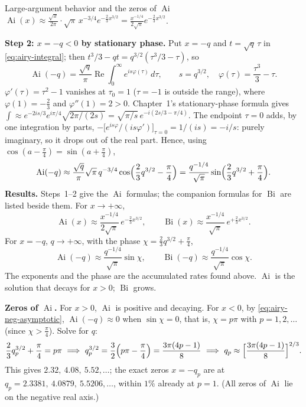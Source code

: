 \documentclass[11pt]{beamer}
\providecommand{\Ai}{\operatorname{Ai}}
\providecommand{\Bi}{\operatorname{Bi}}
\begin{document}
\begin{frame}[allowframebreaks=1.00]{Large-argument behavior and the zeros of $\Ai$}
\(\Ai(x)\approx\frac{\sqrt x}{2\pi}\cdot\sqrt\pi\,x^{-3/4}e^{-\frac23x^{3/2}}=\frac{x^{-1/4}}{2\sqrt\pi}e^{-\frac23x^{3/2}}\).
\par\framebreak\par
\textbf{Step 2: \(x=-q<0\) by stationary phase.} Put \(x=-q\) and \(t=\sqrt q\,\tau\) in \eqref{eq:airy-integral}; then
\(t^3/3-qt=q^{3/2}(\tau^3/3-\tau)\), so
\[
 \Ai(-q)=\frac{\sqrt q}{\pi}\operatorname{Re}\int_0^\infty e^{is\varphi(\tau)}\,d\tau,\qquad s=q^{3/2},\quad \varphi(\tau)=\frac{\tau^3}3-\tau .
\]
\(\varphi'(\tau)=\tau^2-1\) vanishes at \(\tau_0=1\) (\(\tau=-1\) is outside the range), where \(\varphi(1)=-\frac23\) and \(\varphi''(1)=2>0\).
Chapter~1's stationary-phase formula gives \(\int\approx e^{-2is/3}e^{i\pi/4}\sqrt{2\pi/(2s)}=\sqrt{\pi/s}\,e^{-i(2s/3-\pi/4)}\). The endpoint
\(\tau=0\) adds, by one integration by parts, \(-\bigl[e^{is\varphi}/(is\varphi')\bigr]_{\tau=0}=1/(is)=-i/s\): purely imaginary, so it drops
out of the real part. Hence, using \(\cos(a-\frac\pi4)=\sin(a+\frac\pi4)\),
\[
 \Ai(-q)\approx\frac{\sqrt q}{\pi}\sqrt\pi\,q^{-3/4}\cos\Bigl(\frac23q^{3/2}-\frac\pi4\Bigr)
 =\frac{q^{-1/4}}{\sqrt\pi}\sin\Bigl(\frac23q^{3/2}+\frac\pi4\Bigr).
\]
\textbf{Results.} Steps~1--2 give the \(\Ai\) formulas; the companion formulas for \(\Bi\) are listed
beside them. For \(x\to+\infty\),
\begin{equation}
 \Ai(x)\approx\frac{x^{-1/4}}{2\sqrt\pi}\,e^{-\frac23x^{3/2}},
 \qquad
 \Bi(x)\approx\frac{x^{-1/4}}{\sqrt\pi}\,e^{+\frac23x^{3/2}}.
 \label{eq:airy-pos-asymptotic}
\end{equation}
For \(x=-q\), \(q\to+\infty\), with the phase \(\chi=\frac23q^{3/2}+\frac\pi4\),
\begin{equation}
 \Ai(-q)\approx\frac{q^{-1/4}}{\sqrt\pi}\sin\chi,
 \qquad
 \Bi(-q)\approx\frac{q^{-1/4}}{\sqrt\pi}\cos\chi .
 \label{eq:airy-neg-asymptotic}
\end{equation}
The exponents and the phase are the accumulated rates found above. \(\Ai\) is the solution that
decays for \(x>0\); \(\Bi\) grows.

\textbf{Zeros of \(\Ai\).} For \(x>0\), \(\Ai\) is positive and decaying. For \(x<0\), by
\eqref{eq:airy-neg-asymptotic}, \(\Ai(-q)\approx0\) when \(\sin\chi=0\), that is, \(\chi=p\pi\) with
\(p=1,2,\dots\) (since \(\chi>\frac\pi4\)). Solve for \(q\):
\[
 \frac23q_p^{3/2}+\frac\pi4=p\pi
 \ \Longrightarrow\
 q_p^{3/2}=\frac32\Bigl(p\pi-\frac\pi4\Bigr)=\frac{3\pi(4p-1)}{8}
 \ \Longrightarrow\
 q_p\approx\Bigl[\frac{3\pi(4p-1)}{8}\Bigr]^{2/3}.
\]
This gives \(2.32,\ 4.08,\ 5.52,\dots\); the exact zeros \(x=-q_p\) are at
\(q_p=2.3381,\ 4.0879,\ 5.5206,\dots\), within \(1\%\) already at \(p=1\). (All zeros of \(\Ai\) lie on the
negative real axis.)
\end{frame}
\end{document}
